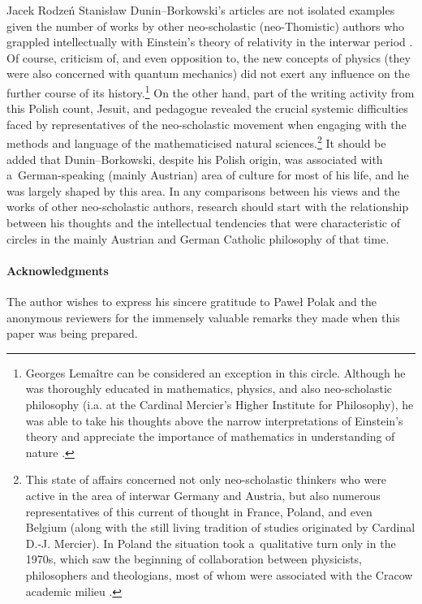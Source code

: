 \begin{artengenv}{Jacek Rodzeń}
Stanisław Dunin–Borkowski's articles are not isolated examples given the number of works by other neo-scholastic (neo-Thomistic) authors who grappled intellectually with Einstein's theory of relativity in the interwar period 
\parencites[cf.][]{polak_zmagania_2016}[and beyond the above-mentioned works][]{glick_relativity_1987}[][]{flipse_between_2010}[][]{hagen_local_2020}. %
 Of course, criticism of, and even opposition to, the new concepts of physics (they were also concerned with quantum mechanics) did not exert any influence on the further course of its history.\footnote{Georges Lemaître can be considered an exception in this circle. Although he was thoroughly educated in mathematics, physics, and also neo-scholastic philosophy (i.a. at the Cardinal Mercier's Higher Institute for Philosophy), he was able to take his thoughts above the narrow interpretations of Einstein's theory and appreciate the importance of mathematics in understanding of nature 
\parencite[][pp.241–242]{hagen_local_2020}.%
} On the other hand, part of the writing activity from this Polish count, Jesuit, and pedagogue revealed the crucial systemic difficulties faced by representatives of the neo-scholastic movement when engaging with the methods and language of the mathematicised natural sciences.\footnote{This state of affairs concerned not only neo-scholastic thinkers  who were active in the area of interwar Germany and Austria, but also numerous representatives of this current of thought in France, Poland, and even Belgium (along with the still living tradition of studies originated by Cardinal D.-J. Mercier). In Poland the situation took a~qualitative turn only in the 1970s, which saw the beginning of collaboration between physicists, philosophers and theologians, most of whom were associated with the Cracow academic milieu 
\parencites[cf.][]{wolak_filozofia_1991}[][]{polak_science-religion_2021}[][]{trombik_koncepcje_2021}. %
 } It should be added that Dunin–Borkowski, despite his Polish origin, was associated with a~German-speaking (mainly Austrian) area of culture for most of his life, and he was largely shaped by this area. In any comparisons between his views and the works of other neo-scholastic authors, research should start with the relationship between his thoughts and the intellectual tendencies that were characteristic of circles in the mainly Austrian and German Catholic philosophy of that time.

\paragraph{Acknowledgments}
The author wishes to express his sincere gratitude to Paweł Polak and the anonymous reviewers for the immensely valuable remarks they made when this paper was being prepared.

\end{artengenv}
